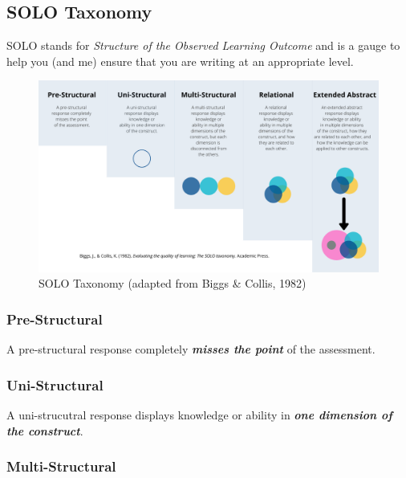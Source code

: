\documentclass[
]{book}
\begin{document}
\hypertarget{solo-taxonomy}{%
\subsection*{SOLO Taxonomy}\label{solo-taxonomy}}

SOLO stands for \emph{Structure of the Observed Learning Outcome} and is a gauge to help you (and me) ensure that you are writing at an appropriate level.

\begin{figure}
\centering
\includegraphics{assets/SOLO-taxonomy.png}
\caption{SOLO Taxonomy (adapted from Biggs \& Collis, 1982)}
\end{figure}

\hypertarget{pre-structural}{%
\subsubsection*{Pre-Structural}\label{pre-structural}}

A pre-structural response completely \textbf{\emph{misses the point}} of the assessment.

\hypertarget{uni-structural}{%
\subsubsection*{Uni-Structural}\label{uni-structural}}

A uni-strucutral response displays knowledge or ability in \textbf{\emph{one dimension of the construct}}.

\hypertarget{multi-structural}{%
\subsubsection*{Multi-Structural}\label{multi-structural}}
\end{document}
